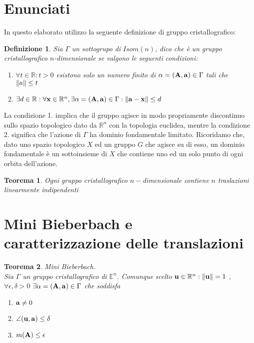 \documentclass[a4paper,11pt,openright,twoside	]{book}
\newtheorem{definition}{Definizione}[section]
\newtheorem{theorem}{Teorema}[section]
\begin{document}
\section{Enunciati}
In questo elaborato utilizzo la seguente definizione di gruppo cristallografico:
\begin{definition}
Sia $\Gamma$ un sottogrupo di $Isom(n)$, dico che è un gruppo cristallografico $n$-dimensionale se valgono le seguenti condizioni:
\begin{enumerate}
	\item $ \forall t \in \mathbb{R} : t > 0 $  esistono solo un numero finito di $\alpha = \vb{(A, a)} \in \Gamma $  tali che  $\norm{a} \leq t$ 
	\item $ \exists d \in \mathbb{R}: \forall \vb{x} \in \mathbb{R}^n ,  \exists \alpha = \vb{(A,a)} \in \Gamma : \norm{\vb{a-x}}\leq d $
\end{enumerate}
\end{definition}
La condizione 1. implica che il gruppo agisce in modo propriamente discontinuo sullo spazio topologico dato da $\mathbb{R}^n$ con la topologia euclidea, mentre la condizione 2. significa che l'azione di $\Gamma$ ha dominio fondamentale limitato. Ricoridamo che, dato uno spazio topologico $X$ ed un gruppo $G$ che agisce su di esso, un dominio fondamentale è un sottoinsieme di $X$ che contiene uno ed un solo punto di ogni orbita dell'azione.\\
\begin{theorem}
Ogni gruppo cristallografico $n-$dimensionale contiene $n$ traslazioni linearmente indipendenti
\end{theorem}
\newpage 
\section{Mini Bieberbach e caratterizzazione delle translazioni} 
\begin{theorem}{Mini Bieberbach.} \\
Sia $\Gamma$ un gruppo cristallografico di $\mathbb{E}^n$. Comunque scelto $ \vb{u} \in \mathbb{R}^n : \norm{\vb{u}} = 1$ ,\\
$  \forall \epsilon ,\delta >0 $ $   \exists \alpha = \vb{(A,a)} \in \Gamma $ che soddisfa 
\begin{enumerate}
\item $\vb{a} \neq 0$ 
\item $ \angle (\vb{u, a}) \leq \delta $
\item $ m(\vb{A}) \leq \epsilon$ 
\end{enumerate}
\end{theorem}
\end{document}
